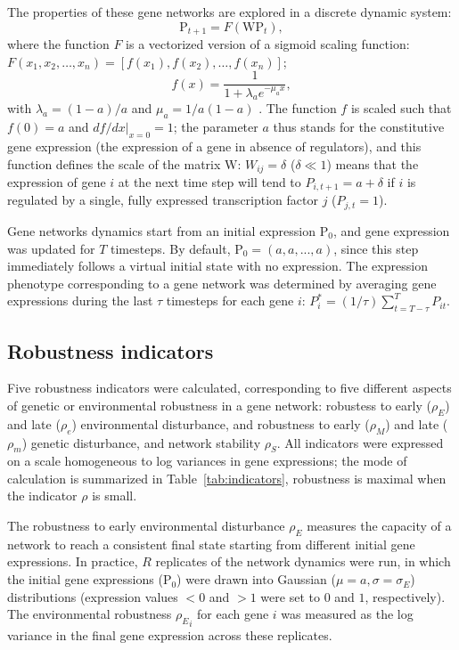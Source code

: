 \documentclass[10pt,a4paper]{article}
\newcommand{\stability}{{\rho_S}}
\newcommand{\earlyenv}{{\rho_E}}
\newcommand{\lateenv}{{\rho_e}}
\newcommand{\earlymut}{{\rho_M}}
\newcommand{\latemut}{{\rho_m}}
\newcommand{\W}{\bm{\mathrm W}}
\newcommand{\Pp}{\bm{\mathrm P}}
\begin{document}
The properties of these gene networks are explored in a discrete dynamic system:
\begin{equation}
 \Pp_{t+1} = F(\W \Pp_t),
\end{equation}
\noindent where the function $F$ is a vectorized version of a sigmoid scaling function: $F(x_1, x_2, \dots, x_n) = [f(x_1), f(x_2), \dots, f(x_n)]$;
\begin{equation} \label{eq:fx}
f(x) = \frac{1}{1+ \lambda_a e ^{- \mu_a x}}, 
\end{equation}
\noindent with $\lambda_a = (1-a)/a$ and $\mu_a = 1/a(1-a)$ \citep{GCL+18}. The function $f$ is scaled such that $f(0) = a$ and $df/dx|_{x=0}=1$; the parameter $a$ thus stands for the constitutive gene expression (the expression of a gene in absence of regulators), and this function defines the scale of the matrix $\W$: $W_{ij} = \delta$ ($\delta \ll 1$) means that the expression of gene $i$ at the next time step will tend to $P_{i,t+1} = a + \delta$ if $i$ is regulated by a single, fully expressed transcription factor $j$ ($P_{j,t} = 1$).

Gene networks dynamics start from an initial expression $\Pp_0$, and gene expression was updated for $T$ timesteps. By default, $\Pp_0 = (a, a, ..., a)$, since this step immediately follows a virtual initial state with no expression. The expression phenotype corresponding to a gene network was determined by averaging gene expressions during the last $\tau$ timesteps for each gene $i$: $P_i^* = (1/\tau)\sum_{t=T-\tau}^T P_{it}$. 

\subsection{Robustness indicators}

Five robustness indicators were calculated, corresponding to five different aspects of genetic or environmental robustness in a gene network: robustess to early ($\earlyenv$) and late ($\lateenv$) environmental disturbance, and robustness to early ($\earlymut$) and late ($\latemut$) genetic disturbance, and network stability $\stability$. All indicators were expressed on a scale homogeneous to log variances in gene expressions; the mode of calculation is summarized in Table~\ref{tab:indicators}, robustness is maximal when the indicator $\rho$ is small. 

The robustness to early environmental disturbance $\earlyenv$ measures the capacity of a network to reach a consistent final state starting from different initial gene expressions. In practice, $R$ replicates of the network dynamics were run, in which the initial gene expressions ($\Pp_0$) were drawn into Gaussian ($\mu = a, \sigma = \sigma_E$) distributions (expression values $<0$ and $>1$ were set to $0$ and $1$, respectively). The environmental robustness $\earlyenv_i$ for each gene $i$ was measured as the log variance in the final gene expression across these replicates. 
\end{document}
